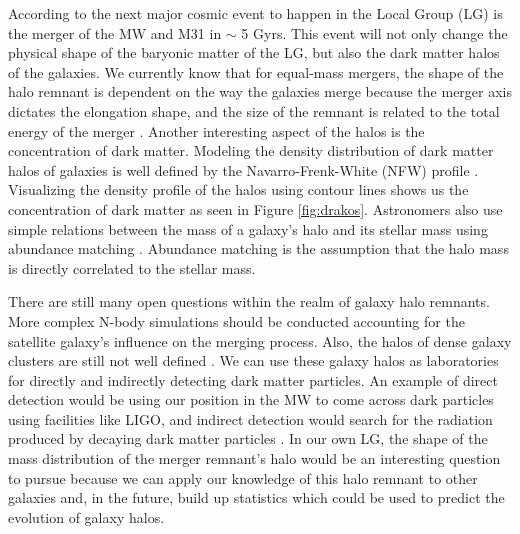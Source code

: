 \documentclass[linenumbers, twocolumn]{aastex631}
\begin{document}
According to \cite{2012VanDerMarel} the next major cosmic event to happen in the Local Group (LG) is the merger of the MW and M31 in $\sim$ 5 Gyrs. 
This event will not only change the physical shape of the baryonic matter of the LG, but also the dark matter halos of the galaxies.
We currently know that for equal-mass mergers, the shape of the halo remnant is dependent on the way the galaxies merge because the merger axis dictates the elongation shape, and the size of the remnant is related to the total energy of the merger \citep{2019drakos}. 
Another interesting aspect of the halos is the concentration of dark matter.
Modeling the density distribution of dark matter halos of galaxies is well defined by the Navarro-Frenk-White (NFW) profile \citep{1996NFW}. Visualizing the density profile of the halos using contour lines shows us the concentration of dark matter as seen in Figure \ref{fig:drakos}.
Astronomers also use simple relations between the mass of a galaxy's halo and its stellar mass using abundance matching \citep{2018Wechsler}. Abundance matching is the assumption that the halo mass is directly correlated to the stellar mass.

There are still many open questions within the realm of galaxy halo remnants.
More complex N-body simulations should be conducted accounting for the satellite galaxy's influence on the merging process. Also, the halos of dense galaxy clusters are still not well defined \citep{2019drakos}. 
We can use these galaxy halos as laboratories for directly and indirectly detecting dark matter particles. An example of direct detection would be using our position in the MW to come across dark particles using facilities like LIGO, and indirect detection would search for the radiation produced by decaying dark matter particles \citep{2012Frenk_White}. In our own LG, the shape of the mass distribution of the merger remnant's halo would be an interesting question to pursue because we can apply our knowledge of this halo remnant to other galaxies and, in the future, build up statistics which could be used to predict the evolution of galaxy halos.
\end{document}
